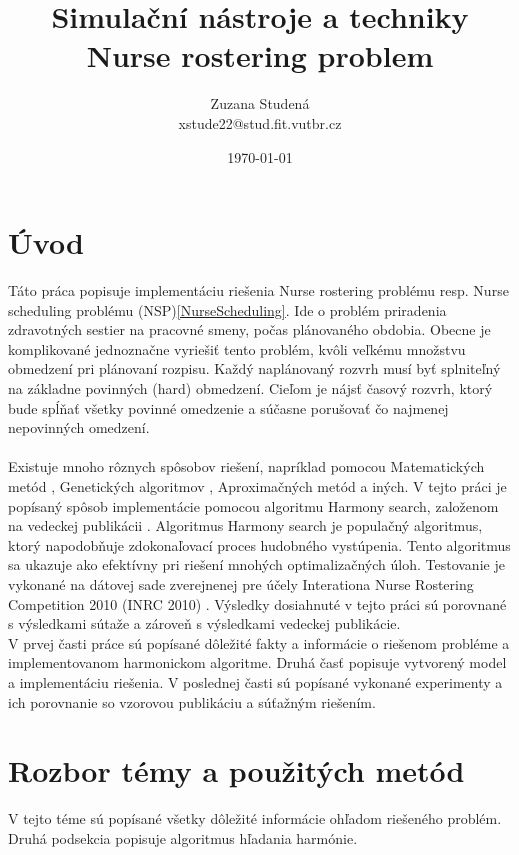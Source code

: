 \documentclass[a4paper, 14pt]{article}
\begin{document}
\title{Simulační nástroje a techniky\\
Nurse rostering problem}
\author{Zuzana Studená\\ 
xstude22@stud.fit.vutbr.cz}
\date{\today}

\maketitle

\section{Úvod}

Táto práca popisuje implementáciu riešenia Nurse rostering problému resp. Nurse scheduling problému (NSP)\ref{NurseScheduling}. Ide o problém priradenia zdravotných sestier na pracovné smeny, počas plánovaného obdobia. Obecne je komplikované jednoznačne vyriešiť tento problém, kvôli veľkému množstvu obmedzení pri plánovaní rozpisu. Každý naplánovaný rozvrh musí byť splniteľný na základne povinných (hard) obmedzení. Cieľom je nájsť časový rozvrh, ktorý bude spĺňať všetky povinné omedzenie a súčasne porušovať čo najmenej nepovinných omedzení.\\
\\
Existuje mnoho rôznych spôsobov riešení, napríklad pomocou Matematických metód \cite{Math}, Genetických algoritmov \cite{Gen}, Aproximačných metód\cite{Apr} a iných. V tejto práci je popísaný spôsob implementácie pomocou algoritmu Harmony search, založenom na vedeckej publikácii \cite{MainArticle}. Algoritmus Harmony search\cite{HS} je populačný algoritmus, ktorý napodobňuje zdokonaľovací proces hudobného vystúpenia. Tento algoritmus sa ukazuje ako efektívny pri riešení mnohých optimalizačných úloh. Testovanie je vykonané na dátovej sade zverejnenej pre účely Interationa Nurse Rostering Competition 2010 (INRC 2010) \cite{MainArticle}. Výsledky dosiahnuté v tejto práci sú porovnané s výsledkami sútaže a zároveň s výsledkami vedeckej publikácie. \\

V prvej časti práce sú popísané dôležité fakty a informácie o riešenom probléme a implementovanom harmonickom algoritme. Druhá časť popisuje vytvorený model a implementáciu riešenia. V poslednej časti sú popísané vykonané experimenty a ich porovnanie so vzorovou publikáciu a súťažným riešením. \\


\section{Rozbor témy a použitých metód}
V tejto téme sú popísané všetky dôležité informácie ohľadom riešeného problém. Druhá podsekcia popisuje algoritmus hľadania harmónie. 
\end{document}
